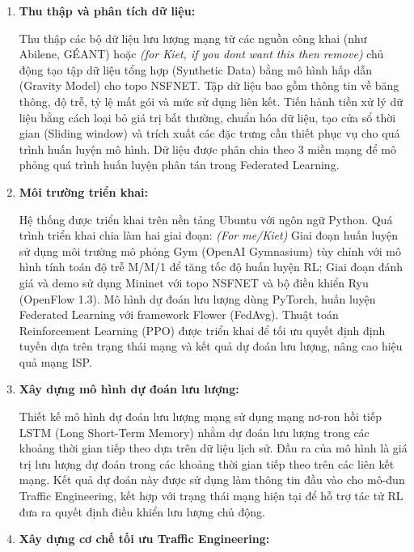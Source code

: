 
\begin{enumerate}
    \item \textbf{Thu thập và phân tích dữ liệu:}
    
    Thu thập các bộ dữ liệu lưu lượng mạng từ các nguồn công khai (như Abilene, GÉANT) hoặc \textit{(for Kiet, if you dont want this then remove)} chủ động tạo tập dữ liệu tổng hợp (Synthetic Data) bằng mô hình hấp dẫn (Gravity Model) cho topo NSFNET. Tập dữ liệu bao gồm thông tin về băng thông, độ trễ, tỷ lệ mất gói và mức sử dụng liên kết. Tiến hành tiền xử lý dữ liệu bằng cách loại bỏ giá trị bất thường, chuẩn hóa dữ liệu, tạo cửa sổ thời gian (Sliding window) và trích xuất các đặc trưng cần thiết phục vụ cho quá trình huấn luyện mô hình. Dữ liệu được phân chia theo 3 miền mạng để mô phỏng quá trình huấn luyện phân tán trong Federated Learning.

    \item \textbf{Môi trường triển khai:}

    Hệ thống được triển khai trên nền tảng Ubuntu với ngôn ngữ Python. Quá trình triển khai chia làm hai giai đoạn: \textit{(For me/Kiet)} Giai đoạn huấn luyện sử dụng môi trường mô phỏng Gym (OpenAI Gymnasium) tùy chỉnh với mô hình tính toán độ trễ M/M/1 để tăng tốc độ huấn luyện RL; Giai đoạn đánh giá và demo sử dụng Mininet với topo NSFNET và bộ điều khiển Ryu (OpenFlow 1.3). Mô hình dự đoán lưu lượng dùng PyTorch, huấn luyện Federated Learning với framework Flower (FedAvg). Thuật toán Reinforcement Learning (PPO) được triển khai để tối ưu quyết định định tuyến dựa trên trạng thái mạng và kết quả dự đoán lưu lượng, nâng cao hiệu quả mạng ISP.

    \item \textbf{Xây dựng mô hình dự đoán lưu lượng:}
    
    Thiết kế mô hình dự đoán lưu lượng mạng sử dụng mạng nơ-ron hồi tiếp LSTM (Long Short-Term Memory) nhằm dự đoán lưu lượng trong các khoảng thời gian tiếp theo dựa trên dữ liệu lịch sử. Đầu ra của mô hình là giá trị lưu lượng dự đoán trong các khoảng thời gian tiếp theo trên các liên kết mạng. Kết quả dự đoán này được sử dụng làm thông tin đầu vào cho mô-đun Traffic Engineering, kết hợp với trạng thái mạng hiện tại để hỗ trợ tác tử RL đưa ra quyết định điều khiển lưu lượng chủ động.

    \item \textbf{Xây dựng cơ chế tối ưu Traffic Engineering:}
    

\end{enumerate}
